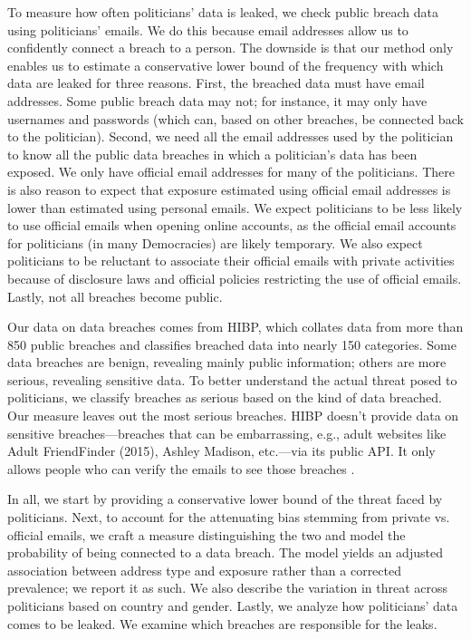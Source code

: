 \documentclass[12pt, letterpaper]{article}
\begin{document}
To measure how often politicians' data is leaked, we check public breach data using politicians' emails. We do this because email addresses allow us to confidently connect a breach to a person. The downside is that our method only enables us to estimate a conservative lower bound of the frequency with which data are leaked for three reasons. First, the breached data must have email addresses. Some public breach data may not; for instance, it may only have usernames and passwords (which can, based on other breaches, be connected back to the politician). Second, we need all the email addresses used by the politician to know all the public data breaches in which a politician's data has been exposed. We only have official email addresses for many of the politicians. There is also reason to expect that exposure estimated using official email addresses is lower than estimated using personal emails. We expect politicians to be less likely to use official emails when opening online accounts, as the official email accounts for politicians (in many Democracies) are likely temporary. We also expect politicians to be reluctant to associate their official emails with private activities because of disclosure laws and official policies restricting the use of official emails. Lastly, not all breaches become public.

Our data on data breaches comes from HIBP, which collates data from more than 850 public breaches and classifies breached data into nearly 150 categories. Some data breaches are benign, revealing mainly public information; others are more serious, revealing sensitive data. To better understand the actual threat posed to politicians, we classify breaches as serious based on the kind of data breached. Our measure leaves out the most serious breaches. HIBP doesn't provide data on sensitive breaches---breaches that can be embarrassing, e.g., adult websites like Adult FriendFinder (2015), Ashley Madison, etc.---via its public API. It only allows people who can verify the emails to see those breaches \citep{HIBP}.

In all, we start by providing a conservative lower bound of the threat faced by politicians. Next, to account for the attenuating bias stemming from private vs. official emails, we craft a measure distinguishing the two and model the probability of being connected to a data breach. The model yields an adjusted association between address type and exposure rather than a corrected prevalence; we report it as such. We also describe the variation in threat across politicians based on country and gender. Lastly, we analyze how politicians' data comes to be leaked. We examine which breaches are responsible for the leaks.
\end{document}
